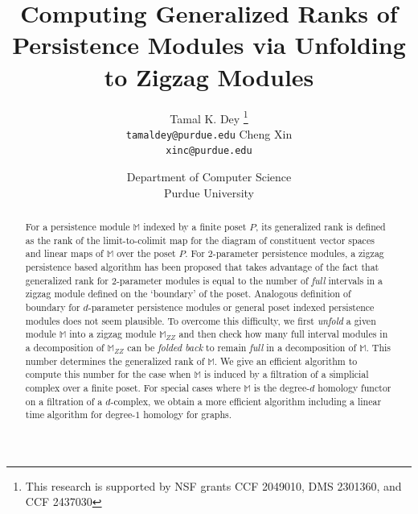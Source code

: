 \documentclass[11pt]{article}
\title{Computing Generalized Ranks of Persistence Modules via Unfolding to Zigzag Modules}
\author{
    Tamal K. Dey
     \thanks{This research is supported by NSF grants CCF 2049010, DMS 2301360, and CCF 2437030}\\
\texttt{tamaldey@purdue.edu} 
 \And
 Cheng Xin\\
\texttt{xinc@purdue.edu} 
}
\date{Department of Computer Science\\ Purdue University}
\theoremstyle{plain}%
\newcommand{\M}{\mathbb{M}}
\begin{document}
\maketitle
\begin{abstract}
For a persistence module $\M$ indexed by a finite poset $P$, its generalized rank is defined as the rank of the limit-to-colimit map for the diagram of constituent vector spaces and linear maps of $\M$
over the poset $P$.  
For $2$-parameter persistence
modules, a zigzag persistence based algorithm has been
proposed that takes advantage of the fact that generalized rank for $2$-parameter modules is equal to the number of \emph{full} intervals in a zigzag module defined on the `boundary' of the poset. Analogous definition of boundary for $d$-parameter persistence modules or general poset indexed persistence modules does not seem plausible. To overcome this difficulty, we first \emph{unfold} a given module $\M$ into a zigzag module $\M_{ZZ}$ and then check how many full interval modules in a decomposition of $\M_{ZZ}$ can be \emph{folded back} to remain \emph{full} in a decomposition of $\M$. This number determines the generalized rank of $\M$. We give an efficient
algorithm to compute this number 
for the case when $\M$ is induced by a filtration of a simplicial complex over
a finite poset.
For special cases where $\M$ is the degree-$d$ homology functor on a filtration of a
$d$-complex, we obtain a more efficient algorithm including a linear time
algorithm for degree-$1$ homology for graphs.

\end{abstract}
\end{document}
